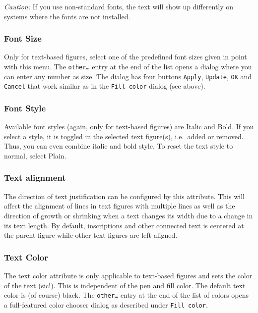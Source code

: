 \emph{Caution:} If you use non-standard fonts, the text will show
up differently on systems where the fonts are not installed.


\subsubsection{Font Size}

Only for text-based figures, select one of the predefined font sizes
given in point with this menu.
The \texttt{other\dots} entry at the end of the list opens a dialog where you
can enter any number as size.
The dialog has four buttons \texttt{Apply}, \texttt{Update}, \texttt{OK}
and \texttt{Cancel} that work similar as in the \texttt{Fill color} dialog
(see above).

\subsubsection{Font Style}

Available font styles (again, only for text-based figures) are
Italic and Bold. If you select a style, it is toggled in the selected
text figure(s), i.e.\ added or removed. Thus, you can even combine
italic and bold style. To reset the text style to normal, select
Plain.

\subsubsection{Text alignment}
The direction of text justification can be configured by this
attribute. This will affect the alignment of lines in text figures with
multiple lines as well as the direction of growth or shrinking
when a text changes its width due to a change in its text length.
By default, inscriptions and other connected text is centered at
the parent figure while other text figures are left-aligned.

\subsubsection{Text Color}

The text color attribute is only applicable to text-based figures and
sets the color of the text (sic!). This is independent of the pen and
fill color. The default text color is (of course) black.
The \texttt{other\dots} entry at the end of the list of colors opens a
full-featured color chooser dialog as described under \texttt{Fill color}.

